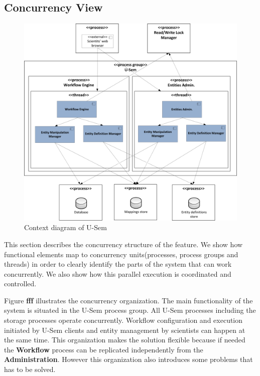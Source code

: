 \documentclass[a4paper, notitlepage]{article}
\begin{document}
\subsection{Concurrency View}

\begin{figure}[h!]
  \centering
  	\includegraphics[scale=0.5]{functional/concur.png}
  \caption{Context diagram of U-Sem }
  \label{fig_context}
\end{figure}

This section describes the concurrency structure of the feature. We show how functional elements map to concurrency units(processes, process groups and threads) in order to clearly identify the parts of the system that can work concurrently. We also show how this parallel execution is coordinated and controlled.

Figure \textbf{fff} illustrates the concurrency organization. The main functionality of the system is situated in the U-Sem process group. All U-Sem processes including the storage processes operate concurrently. Workflow configuration and execution initiated by U-Sem clients and entity management by scientists can happen at the same time. This organization makes the solution flexible because if needed the \textbf{Workflow} process can be replicated independently from the \textbf{Administration}. However this organization also introduces some problems that has to be solved.
\end{document}
